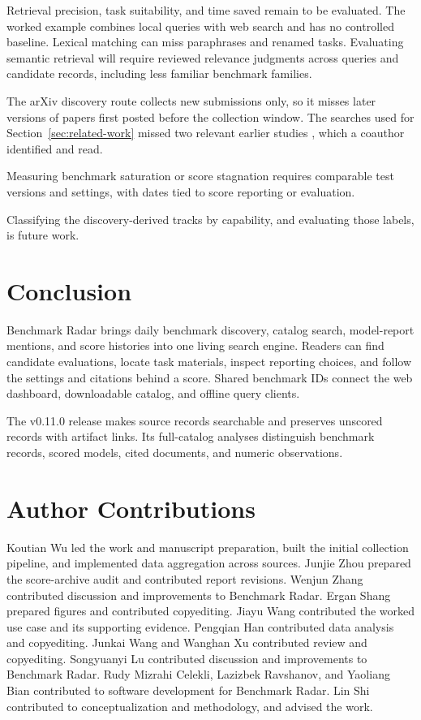 \documentclass[11pt]{article}
\newcommand{\ReportNumber}[1]{\pgfmathprintnumber[fixed,precision=0,1000 sep={,},assume math mode=true]{#1}}
\begin{document}
Retrieval precision, task suitability, and time saved remain to be evaluated. The worked example combines local queries with web search and has no controlled baseline. Lexical matching can miss paraphrases and renamed tasks. Evaluating semantic retrieval \citep{reimers2019sentencebert} will require reviewed relevance judgments across queries and candidate records, including less familiar benchmark families.

The arXiv discovery route collects new submissions only, so it misses later versions of papers first posted before the collection window. The searches used for Section~\ref{sec:related-work} missed two relevant earlier studies \citep{yang2026benchmark,akhtar2026plateau}, which a coauthor identified and read.

Measuring benchmark saturation or score stagnation requires comparable test versions and settings, with dates tied to score reporting or evaluation.

Classifying the \ReportNumber{\CensusUnclassified} discovery-derived tracks by capability, and evaluating those labels, is future work.

\section{Conclusion}

Benchmark Radar brings daily benchmark discovery, catalog search, model-report mentions, and score histories into one living search engine. Readers can find candidate evaluations, locate task materials, inspect reporting choices, and follow the settings and citations behind a score. Shared benchmark IDs connect the web dashboard, downloadable catalog, and offline query clients.

The v0.11.0 release makes \ReportNumber{\CensusRecords} source records searchable and preserves \CensusNoScoreWithLinks{} unscored records with artifact links. Its full-catalog analyses distinguish benchmark records, scored models, cited documents, and numeric observations.

\section*{Author Contributions}
\label{sec:author-contributions}

Koutian Wu led the work and manuscript preparation, built the initial collection pipeline, and implemented data aggregation across sources. Junjie Zhou prepared the score-archive audit and contributed report revisions. Wenjun Zhang contributed discussion and improvements to Benchmark Radar. Ergan Shang prepared figures and contributed copyediting. Jiayu Wang contributed the worked use case and its supporting evidence. Pengqian Han contributed data analysis and copyediting. Junkai Wang and Wanghan Xu contributed review and copyediting. Songyuanyi Lu contributed discussion and improvements to Benchmark Radar. Rudy Mizrahi Celekli, Lazizbek Ravshanov, and Yaoliang Bian contributed to software development for Benchmark Radar. Lin Shi contributed to conceptualization and methodology, and advised the work.
\end{document}
